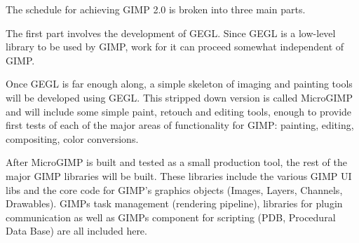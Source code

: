 
The schedule for achieving GIMP 2.0 is broken into three main parts. 

The first part involves the development of GEGL. Since GEGL is a low-level
library to be used by GIMP, work for it can proceed somewhat independent of
GIMP.    

Once GEGL is far enough along, a simple skeleton of imaging and painting tools
will be developed using GEGL. This stripped down version is called MicroGIMP
and will include some simple paint, retouch and editing tools, enough to
provide first tests of each of the major areas of functionality for GIMP:
painting, editing, compositing, color conversions. 

After MicroGIMP is built and tested as a small production tool, the rest of the
major GIMP libraries will be built. These libraries include the various GIMP UI
libs and the core code for GIMP's graphics objects (Images, Layers, Channels,
Drawables). GIMPs task management (rendering pipeline), libraries for plugin
communication  as well as GIMPs component for scripting (PDB, Procedural Data
Base) are all included here.  

